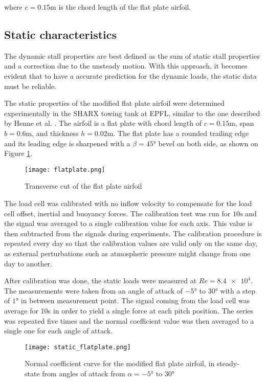 \noindent where $c=0.15\si{\meter}$ is the chord length of the flat plate airfoil. 

\subsection{Static characteristics}

The dynamic stall properties are best defined as the sum of static stall properties and a correction due to the unsteady motion. With this approach, it becomes evident that to have a accurate prediction for the dynamic loads, the static data must be reliable. 


The static properties of the modified flat plate airfoil were determined experimentally in the SHARX towing tank at EPFL, similar to the one described by Henne et al. \cite{henne_dynamic_2018}. The airfoil is a flat plate with chord length of $c=0.15 \si{\meter}$, span $b=0.6 \si{\meter}$, and thickness $h=0.02 \si{\meter}$. The flat plate has a rounded trailing edge and its leading edge is sharpened with a $\beta = \ang{45}$ bevel on both side, as shown on Figure \ref{fig:flatplate}.

\begin{figure}[h]
	\centering
	\texttt{[image: flatplate.png]}
	\caption{Transverse cut of the flat plate airfoil}
	\label{fig:flatplate}
\end{figure}

The load cell was calibrated with no inflow velocity to compensate for the load cell offset, inertial and  buoyancy forces. The calibration test was run for $10 \si{\second}$ and the signal was averaged to a single calibration value for each axis. This value is then subtracted from the signals during experiments. The calibration procedure is repeated every day so that the calibration values are valid only on the same day, as external perturbations such as atmospheric pressure might change from one day to another. 

After calibration was done, the static loads were measured at $Re=\num{8.4e4}$. The measurements were taken from an angle of attack of $\ang{-5}$ to $\ang{30}$ with a step of $\ang{1}$ in between measurement point. The signal coming from the load cell was average for 10s in order to yield a single force at each pitch position. The series was repeated five times and the normal coefficient value was then averaged to a single one for each angle of attack. 

\begin{figure}[h]
	\centering
	\texttt{[image: static\_flatplate.png]}
	\caption{Normal coefficient curve for the modified flat plate airfoil, in steady-state from angles of attack from $\alpha=\ang{-5}$ to $\ang{30}$}
	\label{fig:static_flatplate}
\end{figure}

